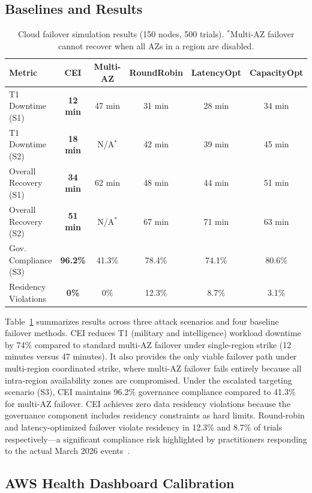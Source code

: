 \documentclass[runningheads]{llncs}
\begin{document}
\subsection{Baselines and Results}

\begin{table}[ht]
\caption{Cloud failover simulation results (150 nodes, 500 trials). $^*$Multi-AZ failover cannot recover when all AZs in a region are disabled.}
\label{tab:cloud}
\centering
\small
\begin{tabular}{lccccc}
\toprule
Metric & \textbf{CEI} & Multi-AZ & RoundRobin & LatencyOpt & CapacityOpt \\
\midrule
T1 Downtime (S1) & \textbf{12 min} & 47 min & 31 min & 28 min & 34 min \\
T1 Downtime (S2) & \textbf{18 min} & N/A$^*$ & 42 min & 39 min & 45 min \\
Overall Recovery (S1) & \textbf{34 min} & 62 min & 48 min & 44 min & 51 min \\
Overall Recovery (S2) & \textbf{51 min} & N/A$^*$ & 67 min & 71 min & 63 min \\
Gov. Compliance (S3) & \textbf{96.2\%} & 41.3\% & 78.4\% & 74.1\% & 80.6\% \\
Residency Violations & \textbf{0\%} & 0\% & 12.3\% & 8.7\% & 3.1\% \\
\bottomrule
\end{tabular}
\end{table}

Table~\ref{tab:cloud} summarizes results across three attack scenarios and four baseline failover methods. CEI reduces T1 (military and intelligence) workload downtime by 74\% compared to standard multi-AZ failover under single-region strike (12 minutes versus 47 minutes). It also provides the only viable failover path under multi-region coordinated strike, where multi-AZ failover fails entirely because all intra-region availability zones are compromised. Under the escalated targeting scenario (S3), CEI maintains 96.2\% governance compliance compared to 41.3\% for multi-AZ failover. CEI achieves zero data residency violations because the governance component includes residency constraints as hard limits. Round-robin and latency-optimized failover violate residency in 12.3\% and 8.7\% of trials respectively---a significant compliance risk highlighted by practitioners responding to the actual March 2026 events~\cite{conversation}.

\subsection{AWS Health Dashboard Calibration}
\label{sec:aws_cal}
\end{document}
